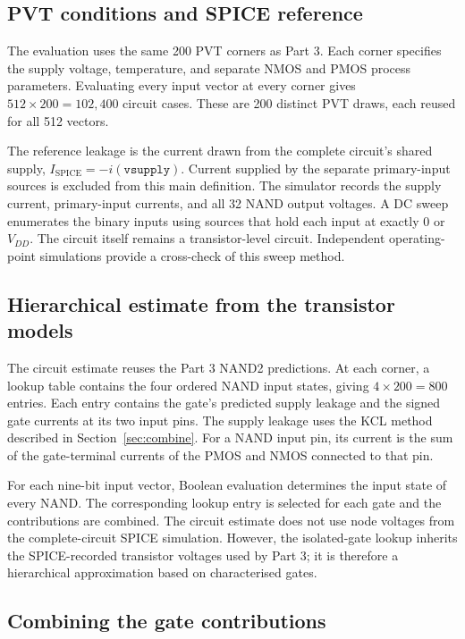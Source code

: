 \subsection{PVT conditions and SPICE reference}
The evaluation uses the same 200 PVT corners as Part 3. Each corner specifies
the supply voltage, temperature, and separate NMOS and PMOS process
parameters. Evaluating every input vector at every corner gives
$512\times200=102{,}400$ circuit cases. These are 200 distinct PVT draws,
each reused for all 512 vectors.

The reference leakage is the current drawn from the complete circuit's
shared supply, $I_{\mathrm{SPICE}}=-i(\texttt{vsupply})$. Current supplied by
the separate primary-input sources is excluded from this main definition.
The simulator records the supply current, primary-input currents, and all
32 NAND output voltages. A DC sweep enumerates the binary inputs using
sources that hold each input at exactly 0 or $V_{DD}$. The circuit itself
remains a transistor-level circuit. Independent operating-point simulations
provide a cross-check of this sweep method.

\subsection{Hierarchical estimate from the transistor models}
The circuit estimate reuses the Part 3 NAND2 predictions. At each corner,
a lookup table contains the four ordered NAND input states, giving
$4\times200=800$ entries. Each entry contains the gate's predicted supply
leakage and the signed gate currents at its two input pins. The supply
leakage uses the KCL method described in Section~\ref{sec:combine}.
For a NAND input pin, its current is the sum of the gate-terminal currents
of the PMOS and NMOS connected to that pin.

For each nine-bit input vector, Boolean evaluation determines the input
state of every NAND. The corresponding lookup entry is selected for each
gate and the contributions are combined. The circuit estimate does not
use node voltages from the complete-circuit SPICE simulation. However,
the isolated-gate lookup inherits the SPICE-recorded transistor voltages
used by Part 3; it is therefore a hierarchical approximation based on
characterised gates.

\subsection{Combining the gate contributions}
